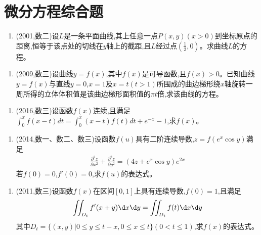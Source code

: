 \documentclass[12pt, a4paper, oneside, UTF8]{ctexbook}
\begin{document}
\section{ 微分方程综合题}

\begin{enumerate}[label=\arabic*.,start=18]
    \item (2001,数二)设$L$是一条平面曲线,其上任意一点$P(x,y)(x>0)$到坐标原点的距离,恒等于该点处的切线在$y$轴上的截距,且$L$经过点$(\frac{1}{2},0)$。求曲线$L$的方程。
    
    \begin{solution}
    \newpage
    \end{solution}
\end{enumerate}

\begin{enumerate}[label=\arabic*.,start=19]
    \item (2009,数三)设曲线$y=f(x)$,其中$f(x)$是可导函数,且$f(x)>0$。已知曲线$y=f(x)$与直线$y=0$,$x=1$及$x=t(t>1)$所围成的曲边梯形绕$x$轴旋转一周所得的立体体积值是该曲边梯形面积值的$\pi t$倍,求该曲线的方程。
    
    \begin{solution}
    \newpage
    \end{solution}
\end{enumerate}

\begin{enumerate}[label=\arabic*.,start=20]
    \item (2016,数三)设函数$f(x)$连续,且满足$\int_0^x f(x-t)dt=\int_0^x(x-t)f(t)dt+e^{-x}-1$,求$f(x)$。
    
    \begin{solution}
    \newpage
    \end{solution}
\end{enumerate}

\begin{enumerate}[label=\arabic*.,start=21]
    \item (2014,数一、数二、数三)设函数$f(u)$具有二阶连续导数,$z=f(e^x\cos y)$满足
    \begin{align*}
        \frac{\partial^2 z}{\partial x^2}+\frac{\partial^2 z}{\partial y^2}=(4z+e^x\cos y)e^{2x}
    \end{align*}
    若$f(0)=0$,$f'(0)=0$,求$f(u)$的表达式。
    
    \begin{solution}
    \newpage
    \end{solution}
\end{enumerate}

\begin{enumerate}[label=\arabic*.,start=22]
    \item (2011,数三)设函数$f(x)$在区间$[0,1]$上具有连续导数,$f(0)=1$,且满足
    \begin{align*}
        \iint_{D_t} f'(x+y)\d x\d y=\iint_{D_t} f(t)\d x\d y
    \end{align*}
    其中$D_t=\{(x,y)|0\leq y\leq t-x,0\leq x\leq t\}(0<t\leq1)$,求$f(x)$的表达式。
    
    \begin{solution}
    \newpage
    \end{solution}
\end{enumerate}

\ifx\allfiles\undefined
\end{document}
